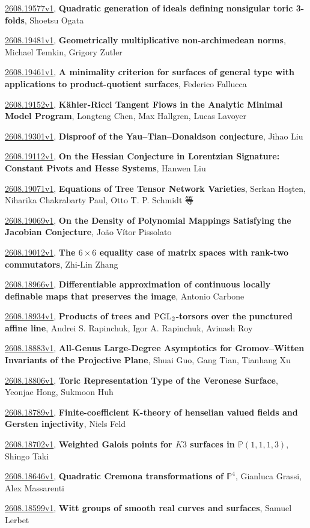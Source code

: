 \documentclass[9pt, a4paper]{article}
\theoremstyle{plain}
\theoremstyle{definition}
\theoremstyle{remark}
\newcommand{\arxiv}[3]{\href{https://arxiv.org/abs/#1}{#1}, \textbf{\textcolor{arxivblue}{#2}}, #3}
\begin{document}
\arxiv{2608.19577v1}{Quadratic generation of ideals defining nonsigular toric 3-folds}{Shoetsu Ogata}

\arxiv{2608.19481v1}{Geometrically multiplicative non-archimedean norms}{Michael Temkin, Grigory Zutler}

\arxiv{2608.19461v1}{A minimality criterion for surfaces of general type with applications to product-quotient surfaces}{Federico Fallucca}

\arxiv{2608.19152v1}{Kähler-Ricci Tangent Flows in the Analytic Minimal Model Program}{Longteng Chen, Max Hallgren, Lucas Lavoyer}

\arxiv{2608.19301v1}{Disproof of the Yau--Tian--Donaldson conjecture}{Jihao Liu}

\arxiv{2608.19112v1}{On the Hessian Conjecture in Lorentzian Signature: Constant Pivots and Hesse Systems}{Hanwen Liu}

\arxiv{2608.19071v1}{Equations of Tree Tensor Network Varieties}{Serkan Hoşten, Niharika Chakrabarty Paul, Otto T. P. Schmidt 等}

\arxiv{2608.19069v1}{On the Density of Polynomial Mappings Satisfying the Jacobian Conjecture}{João Vítor Pissolato}

\arxiv{2608.19012v1}{The $6\times6$ equality case of matrix spaces with rank-two commutators}{Zhi-Lin Zhang}

\arxiv{2608.18966v1}{Differentiable approximation of continuous locally definable maps that preserves the image}{Antonio Carbone}

\arxiv{2608.18934v1}{Products of trees and ${\rm PGL}_2$-torsors over the punctured affine line}{Andrei S. Rapinchuk, Igor A. Rapinchuk, Avinash Roy}

\arxiv{2608.18883v1}{All-Genus Large-Degree Asymptotics for Gromov--Witten Invariants of the Projective Plane}{Shuai Guo, Gang Tian, Tianhang Xu}

\arxiv{2608.18806v1}{Toric Representation Type of the Veronese Surface}{Yeonjae Hong, Sukmoon Huh}

\arxiv{2608.18789v1}{Finite-coefficient K-theory of henselian valued fields and Gersten injectivity}{Niels Feld}

\arxiv{2608.18702v1}{Weighted Galois points for $K3$ surfaces in $\mathbb{P}(1,1,1, 3)$}{Shingo Taki}

\arxiv{2608.18646v1}{Quadratic Cremona transformations of $\mathbb{P}^4$}{Gianluca Grassi, Alex Massarenti}

\arxiv{2608.18599v1}{Witt groups of smooth real curves and surfaces}{Samuel Lerbet}
\end{document}

